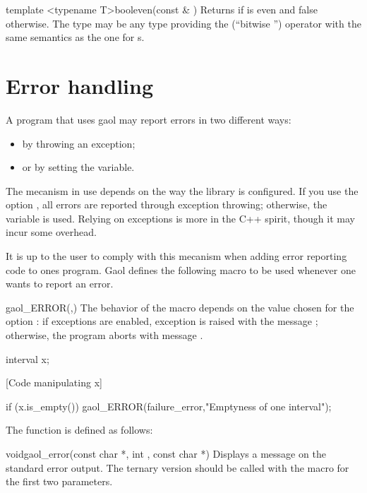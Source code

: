 \documentclass{manual}
\begin{document}
\begin{defTfun}{template <typename T>}{bool}{even}{(const \& )}
  Returns  if  is even and false otherwise. The 
  type may be any type providing the \code{\&} (``bitwise '') operator
  with the same semantics as the one for s.
\end{defTfun}

\chapter{Error handling}

A program that uses gaol may report errors in two different ways:
\begin{itemize}
\item by throwing an exception;
\item or by setting the  variable.
\end{itemize}

The mecanism in use depends on the way the library is configured. If
you use the option , all errors are
reported through exception throwing; otherwise, the 
variable is used. Relying on exceptions is more in the C++ spirit,
though it may incur some overhead.

It is up to the user to comply with this mecanism when adding error reporting
code to ones program. Gaol defines the following macro to be used
whenever one wants to report an error.

\begin{defmacroA}{gaol\_ERROR}{(,)}
  The behavior of the macro depends on the value chosen for the option
  : if exceptions are enabled, exception
   is raised with the message ; otherwise, the
  program aborts with message .

\begin{example}
interval x;

[Code manipulating x]

if (x.is_empty()) {
   gaol_ERROR(failure_error,"Emptyness of one interval");
}
\end{example}
\end{defmacroA}

The  function is defined as follows:

\begin{deffun}{void}{gaol\_error}{(const char *, int ,
const char *)}
Displays a message on the standard error output. The ternary version should be
called with the  macro for the first two parameters.
\end{deffun}
\end{document}
